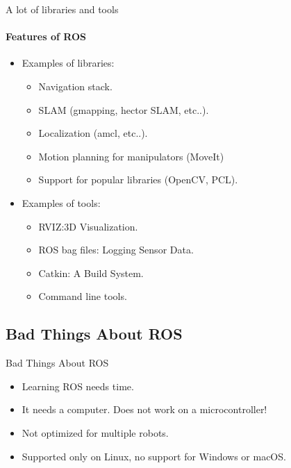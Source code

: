 \documentclass{beamer}
\begin{document}
\begin{frame}{A lot of libraries and tools}
    \framesubtitle{Features of ROS}    
    \begin{itemize}
        \item Examples of libraries:
            \begin{itemize}
                \item Navigation stack.
                \item SLAM (gmapping, hector SLAM, etc..).
                \item Localization (amcl, etc..).
                \item Motion planning for manipulators (MoveIt)
                \item Support for popular libraries (OpenCV, PCL).
            \end{itemize}
            
        \item Examples of tools:
            \begin{itemize}
                \item RVIZ:3D Visualization.
                \item ROS bag files: Logging Sensor Data.
                \item Catkin: A Build System.
                \item Command line tools.
            \end{itemize}        
    \end{itemize}
\end{frame}


\subsection{Bad Things About ROS}

\begin{frame}{Bad Things About ROS}
            \begin{itemize}
                \item Learning ROS needs time. 
                \item It needs a computer. Does not work on a microcontroller!
                \item Not optimized for multiple robots.
                \item Supported only on Linux, no support for Windows or macOS.
            \end{itemize}  
\end{frame}
\end{document}
